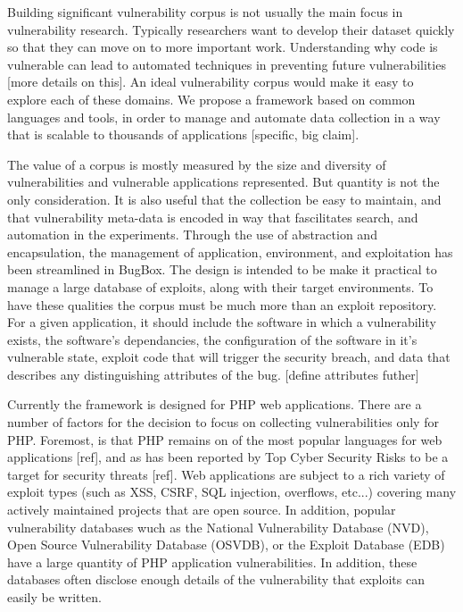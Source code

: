 \documentclass[letterpaper,twocolumn,10pt]{article}
\begin{document}
Building significant vulnerability corpus is not usually the main focus in vulnerability research.  Typically researchers want to develop their dataset quickly so that they can move on to more important work. Understanding why code is vulnerable can lead to automated techniques in preventing future vulnerabilities [more details on this]. An ideal vulnerability corpus would make it easy to explore each of these domains. We propose a framework based on common languages and tools, in order to manage and automate data collection in a way that is scalable to thousands of applications [specific, big claim].\par

The value of a corpus is mostly measured by the size and diversity of vulnerabilities and vulnerable applications represented. But quantity is not the only consideration. It is also useful that the collection be easy to maintain, and that vulnerability meta-data is encoded in way that fascilitates search, and automation in the experiments. Through the use of abstraction and encapsulation, the management of application, environment, and exploitation has been streamlined in BugBox. The design is intended to be make it practical to manage a large database of exploits, along with their target environments. To have these qualities the corpus must be much more than an exploit repository. For a given application, it should include the software in which a vulnerability exists, the software's dependancies, the configuration of the software in it's vulnerable state, exploit code that will trigger the security breach, and data that describes any distinguishing attributes of the bug. [define attributes futher]\par

Currently the framework is designed for PHP web applications. There are a number of factors for the decision to focus on collecting vulnerabilities only for PHP. Foremost, is that PHP remains on of the most popular languages for web applications [ref], and as has been reported by Top Cyber Security Risks to be a target for security threats [ref]. Web applications are subject to a rich variety of exploit types (such as XSS, CSRF, SQL injection, overflows, etc...) covering many actively maintained projects that are open source. In addition, popular vulnerability databases wuch as the National Vulnerability Database (NVD), Open Source Vulnerability Database (OSVDB), or the Exploit Database (EDB) have a large quantity of PHP application vulnerabilities. In addition, these databases often disclose enough details of the vulnerability that exploits can easily be written.\par
  
\end{document}
